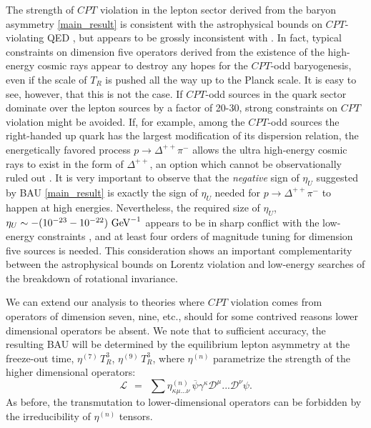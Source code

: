 \documentclass[12pt]{revtex4}
\newcommand{\mc}[1]{\mathcal{#1}}
\newcommand{\md}{\mathcal{D}}
\newcommand{\ov}{\overline}
\newcommand{\GeV}{{\rm GeV}}
\begin{document}
The strength of $CPT$ violation in the lepton sector 
derived from the baryon asymmetry \eqref{main_result} is consistent with the astrophysical bounds on 
$CPT$-violating QED \cite{Jacobson:2005bg}, but appears to be grossly inconsistent with \cite{Gagnon:2004xh}.
In fact, typical constraints on dimension five operators \cite{Gagnon:2004xh} derived from the existence of 
the high-energy cosmic rays appear to destroy any hopes for the $CPT$-odd baryogenesis, even if the 
scale of $T_R$ is pushed all the way up to the Planck scale.  It is easy to see, however, that this is 
not the case. If  $CPT$-odd sources in the quark sector dominate over the lepton sources by a factor of 
20-30, strong constraints on $CPT$ violation might be avoided. If, for example, among the 
$CPT$-odd sources the right-handed up quark has the largest modification of its dispersion relation, 
the energetically favored process $p\to \Delta^{++}\pi^-$ allows the ultra high-energy cosmic rays to exist in the 
form of $\Delta^{++}$, an option which cannot be observationally ruled out \cite{Gagnon:2004xh}. 
It is very important to observe that 
the {\em negative} sign of $\eta_U$ suggested by BAU \eqref{main_result} is exactly the sign of $\eta_U$ 
needed for $p\to \Delta^{++}\pi^-$ to happen at high energies.  
Nevertheless, the required size of $\eta_U$, $\eta_U \sim - (10^{-23}-10^{-22})~\GeV^{-1}$
appears to be in sharp conflict with the low-energy constraints \cite{Sudarsky:2002ue,MP:}, and at least 
four orders of magnitude tuning for dimension five sources is needed. 
This consideration shows an important complementarity between the
astrophysical bounds on Lorentz violation and low-energy searches of the breakdown of rotational 
invariance. 


We can extend our analysis to theories where $CPT$ violation comes from operators of dimension 
seven, nine, etc., should for some contrived reasons lower dimensional operators be absent. 
	We note that to sufficient accuracy, the resulting BAU
	will be determined by the equilibrium lepton asymmetry
	at the freeze-out time, $ \eta^{(7)}\,T_R^3 $, $ \eta^{(9)}\,T_R^3 $, 
	where $\eta^{(n)}$ parametrize the strength of the higher dimensional operators:
\[
	\mc{L} ~~=~~ \sum \eta^{(n)}_{\kappa\mu...\nu}\,
	\ov{\psi} \gamma^\kappa \md^\mu ...\md^\nu  \psi.
\]
As before, the transmutation to lower-dimensional operators can be forbidden 
by the irreducibility of $\eta^{(n)}$ tensors. 
\end{document}
